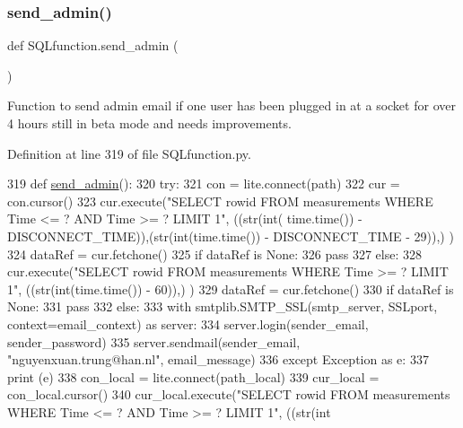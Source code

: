 \subsubsection{\texorpdfstring{send\+\_\+admin()}{send\_admin()}}
{\footnotesize\ttfamily def S\+Q\+Lfunction.\+send\+\_\+admin (\begin{DoxyParamCaption}{ }\end{DoxyParamCaption})}



Function to send admin email if one user has been plugged in at a socket for over 4 hours still in beta mode and needs improvements. 



Definition at line 319 of file S\+Q\+Lfunction.\+py.


\begin{DoxyCode}
319 \textcolor{keyword}{def }\hyperlink{namespace_s_q_lfunction_a75af8b1bb1aa60f32418ac7901b0060b}{send\_admin}():
320     \textcolor{keywordflow}{try}:
321         con = lite.connect(path)
322         cur = con.cursor()
323         cur.execute(\textcolor{stringliteral}{"SELECT rowid FROM measurements WHERE Time <= ? AND Time >= ? LIMIT 1"}, ((str(int(
      time.time()) - DISCONNECT\_TIME)),(str(int(time.time()) - DISCONNECT\_TIME - 29)),) )
324         dataRef = cur.fetchone()
325         \textcolor{keywordflow}{if} dataRef \textcolor{keywordflow}{is} \textcolor{keywordtype}{None}:
326             \textcolor{keywordflow}{pass}
327         \textcolor{keywordflow}{else}:
328             cur.execute(\textcolor{stringliteral}{"SELECT rowid FROM measurements WHERE Time >= ? LIMIT 1"}, ((str(int(time.time()) - 
      60)),) )
329             dataRef = cur.fetchone()
330             \textcolor{keywordflow}{if} dataRef \textcolor{keywordflow}{is} \textcolor{keywordtype}{None}:
331                 \textcolor{keywordflow}{pass}
332             \textcolor{keywordflow}{else}:
333                 with smtplib.SMTP\_SSL(smtp\_server, SSLport, context=email\_context) \textcolor{keyword}{as} server:
334                     server.login(sender\_email, sender\_password)                    
335                     server.sendmail(sender\_email, \textcolor{stringliteral}{"nguyenxuan.trung@han.nl"}, email\_message)
336     \textcolor{keywordflow}{except} Exception \textcolor{keyword}{as} e:
337         \textcolor{keywordflow}{print} (e)
338         con\_local = lite.connect(path\_local)
339         cur\_local = con\_local.cursor()
340         cur\_local.execute(\textcolor{stringliteral}{"SELECT rowid FROM measurements WHERE Time <= ? AND Time >= ? LIMIT 1"}, ((str(int

\end{DoxyCode}
